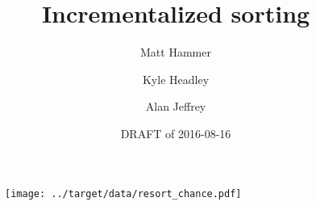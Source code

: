 \documentclass{article}
\title{Incrementalized sorting}
\author{Matt Hammer\and Kyle Headley\and Alan Jeffrey}
\date{DRAFT of 2016-08-16}
\begin{document}
\maketitle

\begin{figure}
  \centering
  \texttt{[image: ../target/data/resort\_chance.pdf]}
\end{figure}

\cite{servo}



\end{document}
